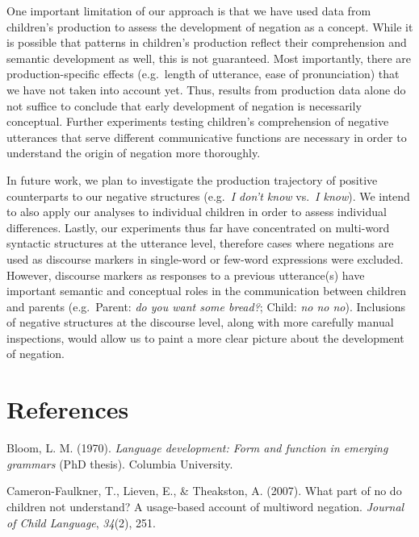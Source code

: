 \documentclass[10pt, letterpaper]{article}
\begin{document}
One important limitation of our approach is that we have used data from
children's production to assess the development of negation as a
concept. While it is possible that patterns in children's production
reflect their comprehension and semantic development as well, this is
not guaranteed. Most importantly, there are production-specific effects
(e.g.~length of utterance, ease of pronunciation) that we have not taken
into account yet. Thus, results from production data alone do not
suffice to conclude that early development of negation is necessarily
conceptual. Further experiments testing children's comprehension of
negative utterances that serve different communicative functions are
necessary in order to understand the origin of negation more thoroughly.

In future work, we plan to investigate the production trajectory of
positive counterparts to our negative structures (e.g.~\emph{I don't
know} vs.~\emph{I know}). We intend to also apply our analyses to
individual children in order to assess individual differences. Lastly,
our experiments thus far have concentrated on multi-word syntactic
structures at the utterance level, therefore cases where negations are
used as discourse markers in single-word or few-word expressions were
excluded. However, discourse markers as responses to a previous
utterance(s) have important semantic and conceptual roles in the
communication between children and parents (e.g.~Parent: \emph{do you
want some bread?}; Child: \emph{no no no}). Inclusions of negative
structures at the discourse level, along with more carefully manual
inspections, would allow us to paint a more clear picture about the
development of negation.

\hypertarget{references}{%
\section{References}\label{references}}

\setlength{\parindent}{-0.1in} 
\setlength{\leftskip}{0.125in}

\noindent

\hypertarget{refs}{}
\leavevmode\hypertarget{ref-bloom1970language}{}%
Bloom, L. M. (1970). \emph{Language development: Form and function in
emerging grammars} (PhD thesis). Columbia University.

\leavevmode\hypertarget{ref-cameron2007part}{}%
Cameron-Faulkner, T., Lieven, E., \& Theakston, A. (2007). What part of
no do children not understand? A usage-based account of multiword
negation. \emph{Journal of Child Language}, \emph{34}(2), 251.
\end{document}
